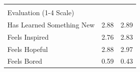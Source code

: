 \documentclass[hideothersubsections, usenames,dvipsnames,11pt]{beamer}
\begin{document}
\begin{frame}
{{\begin{table}[htbp]
\begin{tabular}{lcc}
          																				&       &        \\
    \multicolumn{1}{l}{\textcolor{bdf}{Evaluation (1-4 Scale)}} 								&       &         \\
    \multicolumn{1}{l}{Has Learned Something New} 										& 2.88  & 2.89   \\
    \multicolumn{1}{l}{Feels Inspired} 													& 2.76  & 2.83   \\
    \multicolumn{1}{l}{Feels Hopeful} 													& 2.88  & 2.97  \\
    \multicolumn{1}{l}{Feels Bored} 													& 0.59  & 0.43   \\
    \end{tabular}

\end{table}}}
\end{frame}
\end{document}
